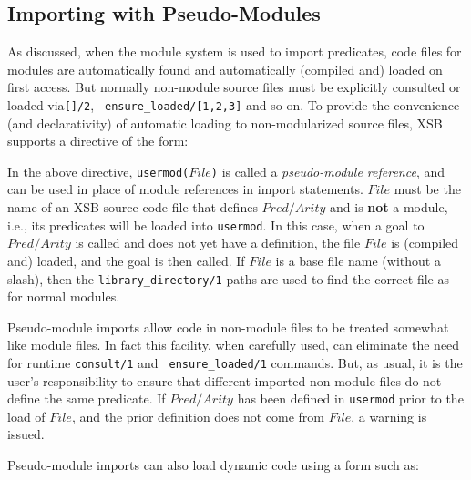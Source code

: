 \subsection{Importing with Pseudo-Modules}

As discussed, when the module system is used to import predicates,
code files for modules are automatically found and automatically
(compiled and) loaded on first access.  But normally non-module source
files must be explicitly consulted or loaded via{\tt []/2}, {\tt
  ensure\_loaded/[1,2,3]} and so on.  To provide the convenience (and
declarativity) of automatic loading to non-modularized source files,
XSB supports a directive of the form:


\noindent 
In the above directive, {\tt usermod($File$)} is called a {\em
  pseudo-module reference}, and can be used in place of module
references in import statements.  $File$ must be the name of an XSB
source code file that defines $Pred/Arity$ and is {\bf not} a module,
i.e., its predicates will be loaded into {\tt usermod}.  In this case,
when a goal to $Pred/Arity$ is called and does not yet have a
definition, the file $File$ is (compiled and) loaded, and the goal is
then called.  If $File$ is a base file name (without a slash), then the
{\tt library\_directory/1} paths are used to find the correct file as
for normal modules.

Pseudo-module imports allow code in non-module files to be treated
somewhat like module files.  In fact this facility, when carefully
used, can eliminate the need for runtime {\tt consult/1} and {\tt
  ensure\_loaded/1} commands.  But, as usual, it is the user's
responsibility to ensure that different imported non-module files do
not define the same predicate.  If $Pred/Arity$ has been defined in
{\tt usermod} prior to the load of $File$, and the prior definition
does not come from $File$, a warning is issued.

Pseudo-module imports can also load dynamic code using a form such as:


